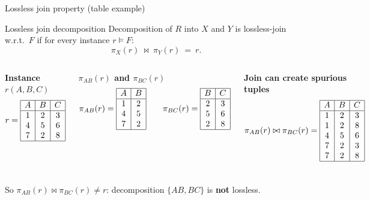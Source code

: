 \documentclass[10pt,aspectratio=169]{beamer}
\newcommand{\proj}{\pi}
\newcommand{\tinytable}[1]{\scriptsize #1 \normalsize}
\begin{document}
\begin{frame}{Lossless join property (table example)}
\begin{block}{Lossless join decomposition}
Decomposition of \(R\) into \(X\) and \(Y\) is lossless-join w.r.t.\ \(F\) if for every instance \(r\models F\):
\[
\proj_X(r)\ \bowtie\ \proj_Y(r)\ =\ r.
\]
\end{block}

\begin{columns}[T,onlytextwidth]
\textbf{Instance \(r(A,B,C)\)}\\[-0.3em]
\tinytable{
\[
r=
\begin{array}{|c|c|c|}\hline
A&B&C\\\hline
1&2&3\\
4&5&6\\
7&2&8\\\hline
\end{array}
\]
}

\textbf{\(\proj_{AB}(r)\) and \(\proj_{BC}(r)\)}\\[-0.3em]
\tinytable{
\[
\proj_{AB}(r)=
\begin{array}{|c|c|}\hline
A&B\\\hline
1&2\\
4&5\\
7&2\\\hline
\end{array}
\qquad
\proj_{BC}(r)=
\begin{array}{|c|c|}\hline
B&C\\\hline
2&3\\
5&6\\
2&8\\\hline
\end{array}
\]
}

\textbf{Join can create spurious tuples}\\[-0.3em]
\tinytable{
\[
\proj_{AB}(r)\bowtie\proj_{BC}(r)=
\begin{array}{|c|c|c|}\hline
A&B&C\\\hline
1&2&3\\
1&2&8\\
4&5&6\\
7&2&3\\
7&2&8\\\hline
\end{array}
\]
}
\end{columns}

\small So \(\proj_{AB}(r)\bowtie\proj_{BC}(r)\neq r\): decomposition \(\{AB,BC\}\) is \textbf{not} lossless.
\end{frame}
\end{document}
